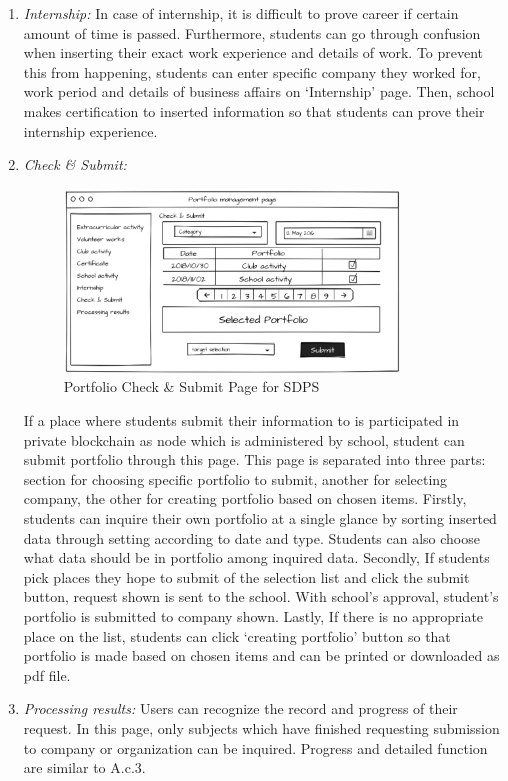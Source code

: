 \documentclass[conference]{IEEEtran}
\begin{document}
\begin{enumerate}
\begin{enumerate}
        \item \textit{Internship:} In case of internship, it is difficult to prove career if certain amount of time is passed. Furthermore, students can go through confusion when inserting their exact work experience and details of work. To prevent this from happening, students can enter specific company they worked for, work period and details of business affairs on ‘Internship’ page. Then, school makes certification to inserted information so that students can prove their internship experience.\\
        \item \textit{Check \& Submit:}
        \begin{figure}[htbp]
	\centerline{\includegraphics[width=89mm,scale=0.5]{student/portfolio_check_and_submit.png}}
	\caption{Portfolio Check \& Submit Page for SDPS}
	\label{fig}
	\end{figure}        
	
         If a place where students submit their information to is participated in private blockchain as node which is administered by school, student can submit portfolio through this page. This page is separated into three parts: section for choosing specific portfolio to submit, another for selecting company, the other for creating portfolio based on chosen items. Firstly, students can inquire their own portfolio at a single glance by sorting inserted data through setting according to date and type. Students can also choose what data should be in portfolio among inquired data. Secondly, If students pick places they hope to submit of the selection list and click the submit button, request shown is sent to the school. With school’s approval, student’s portfolio is submitted to company shown. Lastly, If there is no appropriate place on the list, students can click ‘creating portfolio’ button so that portfolio is made based on chosen items and can be printed or downloaded as pdf file.\\
        \item \textit{Processing results:} Users can recognize the record and progress of their request. In this page, only subjects which have finished requesting submission to company or organization can be inquired. Progress and detailed function are similar to A.c.3.\\
    \end{enumerate}
    

\end{enumerate}
\end{document}
